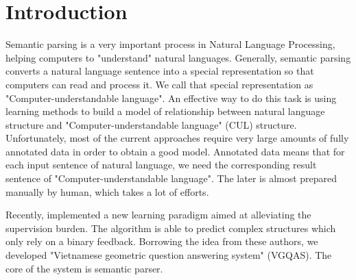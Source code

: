 \section{Introduction}
\label{sec:introduction}

Semantic parsing is a very important process in Natural Language Processing, helping computers to "understand" natural languages. Generally, semantic parsing converts a natural language sentence into a special representation so that computers can read and process it. We call that special representation as "Computer-understandable language". An effective way to do this task is using learning methods to build a model of relationship between natural language structure and "Computer-understandable language" (CUL) structure. Unfortunately, most of the current approaches require very large amounts of fully annotated data in order to obtain a good model. Annotated data means that for each input sentence of natural language, we need the corresponding result sentence of "Computer-understandable language". The later is almost prepared manually by human, which takes a lot of efforts. 

Recently, \citeauthor{Clarke:2010:DSP:1870568.1870571} implemented a new learning paradigm aimed at alleviating the supervision burden. The algorithm is able to predict complex structures which only rely on a binary feedback. Borrowing the idea from these authors, we developed "Vietnamese geometric question answering system" (VGQAS). The core of the system is semantic parser.
